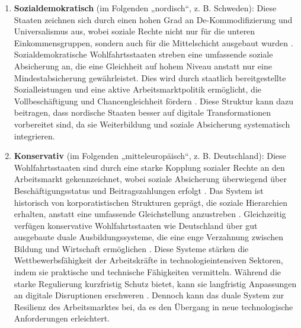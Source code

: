 \begin{enumerate}

    \item \textbf{Sozialdemokratisch} (im Folgenden „nordisch“, z. B. Schweden): Diese 
    Staaten zeichnen sich durch einen hohen Grad an De-Kommodifizierung und Universalismus 
    aus, wobei soziale Rechte nicht nur für die unteren Einkommensgruppen, sondern auch für die 
    Mittelschicht ausgebaut wurden \parencite[S. 27–28]{espingandersen1990thethree}. 
    Sozialdemokratische Wohlfahrtsstaaten streben eine umfassende soziale Absicherung an, 
    die eine Gleichheit auf hohem Niveau anstatt nur eine Mindestabsicherung gewährleistet. 
    Dies wird durch staatlich bereitgestellte Sozialleistungen und eine aktive 
    Arbeitsmarktpolitik ermöglicht, die Vollbeschäftigung und Chancengleichheit fördern 
    \parencite[vgl.][S. 27–28]{espingandersen1990thethree}. Diese Struktur kann dazu 
    beitragen, dass nordische Staaten besser auf digitale Transformationen vorbereitet sind, 
    da sie Weiterbildung und soziale Absicherung systematisch integrieren.

    \item \textbf{Konservativ} (im Folgenden „mitteleuropäisch“, z. B. Deutschland): Diese 
    Wohlfahrtsstaaten sind durch eine starke Kopplung sozialer Rechte an den Arbeitsmarkt 
    gekennzeichnet, wobei soziale Absicherung überwiegend über Beschäftigungsstatus und 
    Beitragszahlungen erfolgt \parencite[S. 27]{espingandersen1990thethree}. Das System ist 
    historisch von korporatistischen Strukturen geprägt, die soziale Hierarchien erhalten,
    anstatt eine umfassende Gleichstellung anzustreben 
    \parencite[vgl.][S. 27]{espingandersen1990thethree}.  
    Gleichzeitig verfügen konservative Wohlfahrtsstaaten wie Deutschland über gut ausgebaute 
    duale Ausbildungssysteme, die eine enge Verzahnung zwischen Bildung und Wirtschaft 
    ermöglichen \parencite[vgl.][S. 25]{hall2001varieties}. Diese Systeme stärken die 
    Wettbewerbsfähigkeit der Arbeitskräfte in technologieintensiven Sektoren, indem sie 
    praktische und technische Fähigkeiten vermitteln. Während die starke Regulierung 
    kurzfristig Schutz bietet, kann sie langfristig Anpassungen an digitale Disruptionen 
    erschweren \parencite[vgl.][S. 25–26]{hall2001varieties}. Dennoch kann das duale 
    System zur Resilienz des Arbeitsmarktes bei, da es den Übergang in neue technologische 
    Anforderungen erleichtert.


\end{enumerate}
